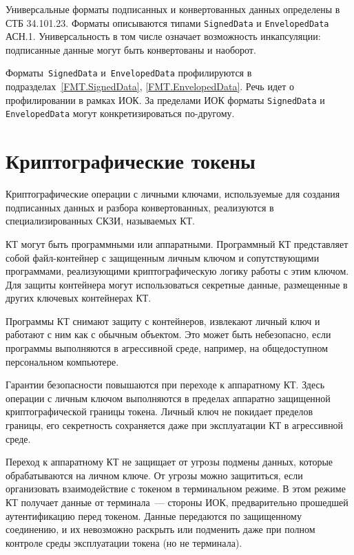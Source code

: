 Универсальные форматы подписанных и конвертованных данных определены в СТБ 34.101.23.
Форматы описываются типами  \texttt{SignedData} и \texttt{EnvelopedData} АСН.1. 
%
Универсальность в том числе означает возможность инкапсуляции:
подписанные данные могут быть конвертованы и наоборот.

Форматы~\texttt{SignedData} и~\texttt{EnvelopedData} профилируются в 
подразделах~\ref{FMT.SignedData}, \ref{FMT.EnvelopedData}. 
Речь идет о профилировании в рамках ИОК. За пределами ИОК форматы
\texttt{SignedData} и \texttt{EnvelopedData} могут конкретизироваться 
по-другому. 

\section{Криптографические токены}

Криптографические операции с личными ключами, используемые для создания 
подписанных данных и разбора конвертованных, реализуются в 
специализированных СКЗИ, называемых КТ.
                                        
КТ могут быть программными или аппаратными.
Программный КТ представляет собой файл-контейнер с защищенным личным 
ключом и сопутствующими программами, реализующими криптографическую 
логику работы с этим ключом. Для защиты контейнера могут использоваться 
секретные данные, размещенные в других ключевых контейнерах КТ.

Программы КТ снимают защиту с контейнеров, извлекают личный ключ и 
работают с ним как с обычным объектом. Это может быть небезопасно, если
программы выполняются в агрессивной среде, например, на общедоступном 
персональном компьютере. 

Гарантии безопасности повышаются при переходе к аппаратному КТ.
Здесь операции с личным ключом выполняются в пределах аппаратно защищенной 
криптографической границы токена. Личный ключ не покидает пределов границы,
его секретность сохраняется даже при эксплуатации КТ в агрессивной среде.

Переход к аппаратному КТ не защищает от угрозы подмены данных,
которые обрабатываются на личном ключе. От угрозы можно защититься,
если организовать взаимодействие с токеном в терминальном режиме.
В этом режиме КТ получает данные от терминала~--- стороны ИОК, 
предварительно прошедшей аутентификацию перед токеном. Данные передаются 
по защищенному соединению, и их невозможно раскрыть или подменить
даже при полном контроле среды эксплуатации токена (но не терминала).

